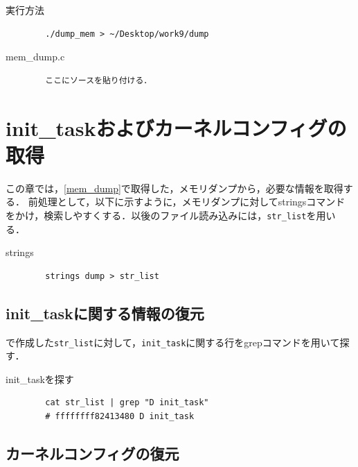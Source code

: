 
\begin{itembox}[l]{実行方法}
    \begin{verbatim}
        ./dump_mem > ~/Desktop/work9/dump
    \end{verbatim}
\end{itembox}

\begin{itembox}[l]{mem_dump.c}
    \begin{verbatim}
        ここにソースを貼り付ける．
    \end{verbatim}
\end{itembox}

\section{init\_taskおよびカーネルコンフィグの取得}
\label{section:strings}

この章では，\ref{mem_dump}で取得した，メモリダンプから，必要な情報を取得する．
前処理として，以下に示すように，メモリダンプに対してstringsコマンドをかけ，検索しやすくする．以後のファイル読み込みには，\verb|str_list|を用いる．

\begin{itembox}[l]{strings}
    \begin{verbatim}
        strings dump > str_list
    \end{verbatim}
\end{itembox}

\subsection{init\_taskに関する情報の復元}

\label{section:mem_dump}で作成した\verb|str_list|に対して，\verb|init_task|に関する行をgrepコマンドを用いて探す．

\begin{itembox}[l]{init_taskを探す}
    \begin{verbatim}
        cat str_list | grep "D init_task"
        # ffffffff82413480 D init_task
    \end{verbatim}
\end{itembox}

\subsection{カーネルコンフィグの復元}

